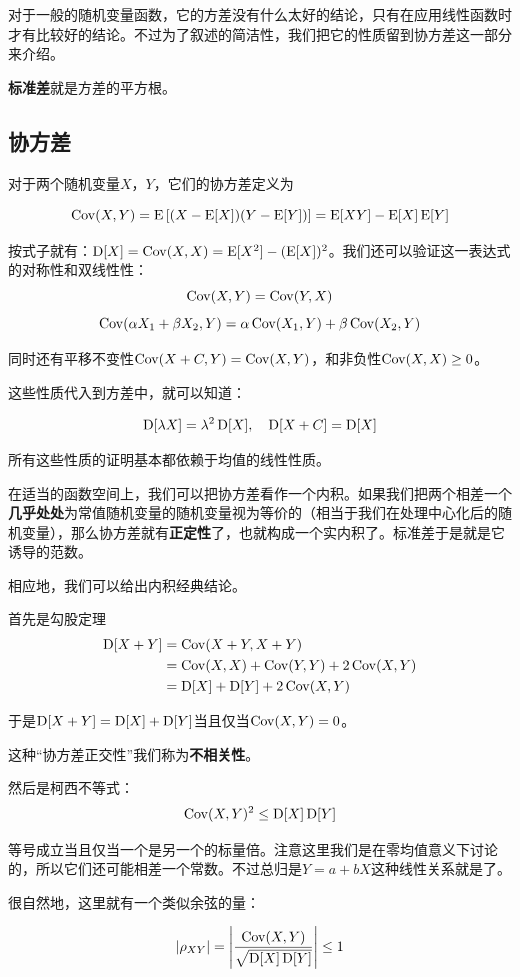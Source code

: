 对于一般的随机变量函数，它的方差没有什么太好的结论，只有在应用线性函数时才有比较好的结论。不过为了叙述的简洁性，我们把它的性质留到协方差这一部分来介绍。

\textbf{标准差}就是方差的平方根。

\subsection{协方差}

对于两个随机变量$X$，$Y$，它们的协方差定义为

\[
\operatorname{Cov}(X,Y) = \operatorname{E}\left[(X-\operatorname{E}[X])(Y-\operatorname{E}[Y])\right] = \operatorname{E}[XY]-\operatorname{E}[X]\operatorname{E}[Y]
\]

按式子就有：$\operatorname{D}[X]=\operatorname{Cov}(X,X)=\operatorname{E}[X^2]-(\operatorname{E}[X])^2$。我们还可以验证这一表达式的对称性和双线性性：
\[
\operatorname{Cov}(X,Y)=\operatorname{Cov}(Y,X)
\]
\[
\operatorname{Cov}(\alpha X_1+\beta X_2,Y) = \alpha \operatorname{Cov}(X_1,Y) +\beta \operatorname{Cov}(X_2,Y)
\]

同时还有平移不变性$\operatorname{Cov}(X+C,Y)=\operatorname{Cov}(X,Y)$，和非负性$\operatorname{Cov}(X,X)\geq 0$。

这些性质代入到方差中，就可以知道：

\[
\operatorname{D}[\lambda X] = \lambda^2\operatorname{D}[X],\quad \operatorname{D}[X+C]=\operatorname{D}[X]
\]

所有这些性质的证明基本都依赖于均值的线性性质。

在适当的函数空间上，我们可以把协方差看作一个内积。如果我们把两个相差一个\textbf{几乎处处}为常值随机变量的随机变量视为等价的（相当于我们在处理中心化后的随机变量），那么协方差就有\textbf{正定性}了，也就构成一个实内积了。标准差于是就是它诱导的范数。

相应地，我们可以给出内积经典结论。

首先是勾股定理
\begin{align*}
\operatorname{D}[X+Y]&=\operatorname{Cov}(X+Y,X+Y)\\
&= \operatorname{Cov}(X,X) + \operatorname{Cov}(Y,Y) + 2\operatorname{Cov}(X,Y)\\
&= \operatorname{D}[X]+\operatorname{D}[Y]+2\operatorname{Cov}(X,Y)
\end{align*}

于是$\operatorname{D}[X+Y]=\operatorname{D}[X]+\operatorname{D}[Y]$当且仅当$\operatorname{Cov}(X,Y)=0$。

这种“协方差正交性”我们称为\textbf{不相关性}。

然后是柯西不等式：
\[
\operatorname{Cov}(X,Y)^2\leq \operatorname{D}[X]\operatorname{D}[Y]
\]

等号成立当且仅当一个是另一个的标量倍。注意这里我们是在零均值意义下讨论的，所以它们还可能相差一个常数。不过总归是$Y=a+bX$这种线性关系就是了。

很自然地，这里就有一个类似余弦的量：

\[
|\rho_{XY}| = \left|\frac{\operatorname{Cov}(X,Y)}{\sqrt{\operatorname{D}[X]\operatorname{D}[Y]}}\right| \leq 1
\]


